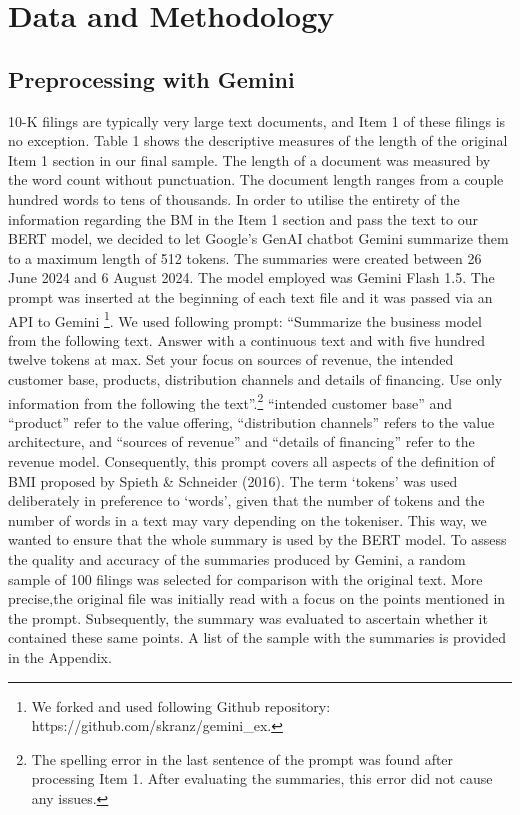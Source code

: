 \documentclass[
]{article}
\begin{document}
\newpage{}

\section{Data and Methodology}\label{data-and-methodology}

\subsection{Preprocessing with Gemini}\label{preprocessing-with-gemini}

10-K filings are typically very large text documents, and Item 1 of
these filings is no exception. Table 1 shows the descriptive measures of
the length of the original Item 1 section in our final sample. The
length of a document was measured by the word count without punctuation.
The document length ranges from a couple hundred words to tens of
thousands. In order to utilise the entirety of the information regarding
the BM in the Item 1 section and pass the text to our BERT model, we
decided to let Google's GenAI chatbot Gemini summarize them to a maximum
length of 512 tokens. The summaries were created between 26 June 2024
and 6 August 2024. The model employed was Gemini Flash 1.5. The prompt
was inserted at the beginning of each text file and it was passed via an
API to Gemini \footnote{We forked and used following Github repository:
  https://github.com/skranz/gemini\_ex.}. We used following prompt:
``Summarize the business model from the following text. Answer with a
continuous text and with five hundred twelve tokens at max. Set your
focus on sources of revenue, the intended customer base, products,
distribution channels and details of financing. Use only information
from the following the text''.\footnote{The spelling error in the last
  sentence of the prompt was found after processing Item 1. After
  evaluating the summaries, this error did not cause any issues.}
``intended customer base'' and ``product'' refer to the value offering,
``distribution channels'' refers to the value architecture, and
``sources of revenue'' and ``details of financing'' refer to the revenue
model. Consequently, this prompt covers all aspects of the definition of
BMI proposed by Spieth \& Schneider (2016). The term `tokens' was used
deliberately in preference to `words', given that the number of tokens
and the number of words in a text may vary depending on the tokeniser.
This way, we wanted to ensure that the whole summary is used by the BERT
model. To assess the quality and accuracy of the summaries produced by
Gemini, a random sample of 100 filings was selected for comparison with
the original text. More precise,the original file was initially read
with a focus on the points mentioned in the prompt. Subsequently, the
summary was evaluated to ascertain whether it contained these same
points. A list of the sample with the summaries is provided in the
Appendix.
\end{document}
